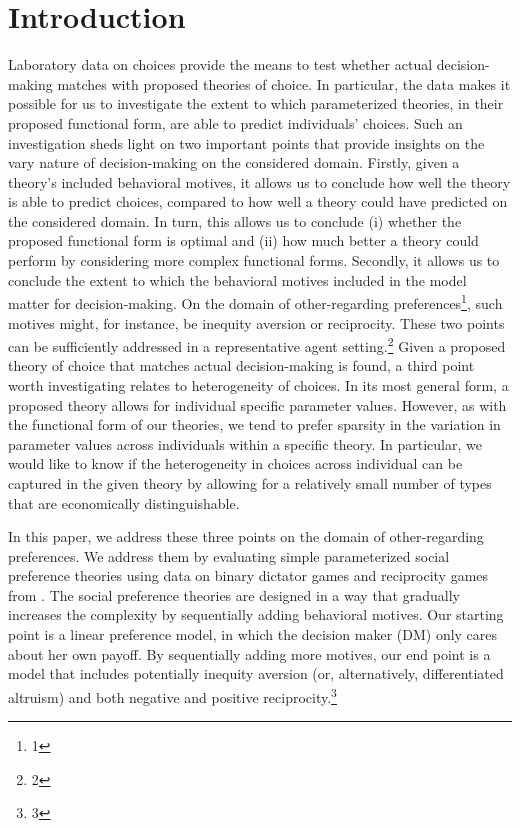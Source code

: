 \documentclass[letterpaper,11pt,leqno]{article}
\begin{document}
\section{Introduction}\label{s:introduction}

Laboratory data on choices provide the means to test whether actual decision-making matches with proposed theories of choice. In particular, the data makes it possible for us to investigate the extent to which parameterized theories, in their proposed functional form, are able to predict individuals' choices. Such an investigation sheds light on two important points that provide insights on the vary nature of decision-making on the considered domain. Firstly, given a theory's included behavioral motives, it allows us to conclude how well the theory is able to predict choices, compared to how well a theory could have predicted on the considered domain. In turn, this allows us to conclude (i) whether the proposed functional form is optimal and (ii) how much better a theory could perform by considering more complex functional forms. Secondly, it allows us to conclude the extent to which the behavioral motives included in the model matter for decision-making. On the domain of other-regarding preferences\footnote{1}, such motives might, for instance, be inequity aversion or reciprocity. These two points can be sufficiently addressed in a representative agent setting.\footnote{2} Given a proposed theory of choice that matches actual decision-making is found, a third point worth investigating relates to heterogeneity of choices. In its most general form, a proposed theory allows for individual specific parameter values. However, as with the functional form of our theories, we tend to prefer sparsity in the variation in parameter values across individuals within a specific theory. In particular, we would like to know if the heterogeneity in choices across individual can be captured in the given theory by allowing for a relatively small number of types that are economically distinguishable.

In this paper, we address these three points on the domain of other-regarding preferences. We address them by evaluating simple parameterized social preference theories using data on binary dictator games and reciprocity games from \cite{Bruhin2019}. The social preference theories are designed in a way that gradually increases the complexity by sequentially adding behavioral motives. Our starting point is a linear preference model, in which the decision maker (DM) only cares about her own payoff. By sequentially adding more motives, our end point is a model that includes potentially inequity aversion (or, alternatively, differentiated altruism) and both negative and positive reciprocity.\footnote{3}
\end{document}
